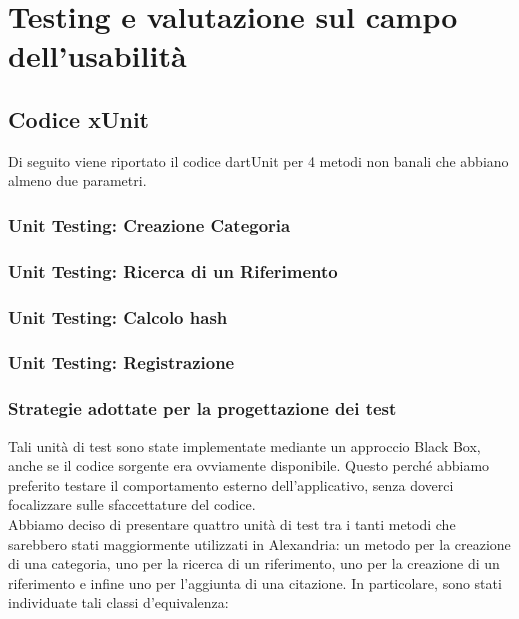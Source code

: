 \chapter{Testing e valutazione sul campo dell'usabilità}
\raggedright{\section{Codice xUnit}}
Di seguito viene riportato il codice dartUnit per 4 metodi non banali che abbiano almeno due parametri.\\

\raggedright{\subsection{Unit Testing: Creazione Categoria}}


\newpage
\raggedright{\subsection{Unit Testing: Ricerca di un Riferimento}}

\newpage
\raggedright{\subsection{Unit Testing: Calcolo hash}}

\raggedright{\subsection{Unit Testing: Registrazione}}

\newpage
\raggedright{\subsection{Strategie adottate per la progettazione dei test}}
Tali unità di test sono state implementate mediante un approccio Black Box, anche se il codice sorgente era ovviamente disponibile. Questo perché abbiamo preferito testare il comportamento esterno dell'applicativo, senza doverci focalizzare sulle sfaccettature del codice. \\
Abbiamo deciso di presentare quattro unità di test tra i tanti metodi che sarebbero stati maggiormente utilizzati in Alexandria: un metodo per la creazione di una categoria, uno per la ricerca di un riferimento, uno per la creazione di un riferimento e infine uno per l'aggiunta di una citazione. In particolare, sono stati individuate tali classi d'equivalenza:

